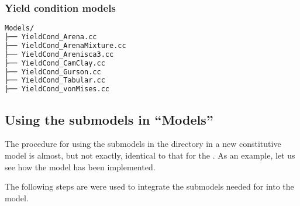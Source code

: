 \subsubsection{Yield condition models}
\begin{lstlisting}[language=sh, backgroundcolor=\color{background}]
Models/
├── YieldCond_Arena.cc
├── YieldCond_ArenaMixture.cc
├── YieldCond_Arenisca3.cc
├── YieldCond_CamClay.cc
├── YieldCond_Gurson.cc
├── YieldCond_Tabular.cc
├── YieldCond_vonMises.cc
\end{lstlisting}

\subsection{Using the submodels in ``Models''} \label{sec:tabular}
The procedure for using the submodels in the  directory in
a new constitutive model is almost, but not exactly, identical to that
for the .  As an example, let us see how the
 model has been implemented.

The following steps are were used to integrate the submodels needed for
 into the model.

